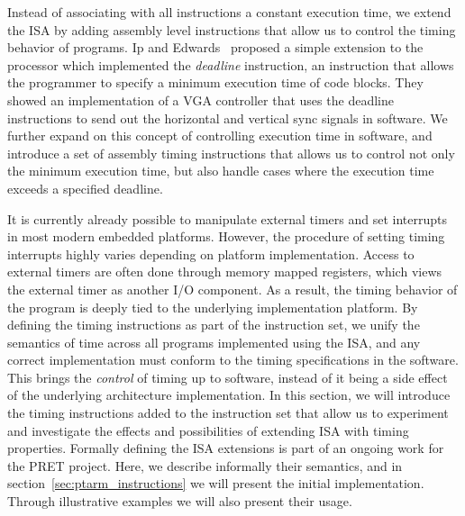 Instead of associating with all instructions a constant execution time, we extend the ISA by adding assembly level instructions that allow us to control the timing behavior of programs. 
Ip and Edwards~\cite{ip2006processor} proposed a simple extension to the processor which implemented the \emph{deadline} instruction, an instruction that allows the programmer to specify a minimum execution time of code blocks.
They showed an implementation of a VGA controller that uses the deadline instructions to send out the horizontal and vertical sync signals in software.
We further expand on this concept of controlling execution time in software, and introduce a set of assembly timing instructions that allows us to 
control not only the minimum execution time, but also handle cases where the execution time exceeds a specified deadline.

It is currently already possible to manipulate external timers and set interrupts in most modern embedded platforms.
However, the procedure of setting timing interrupts highly varies depending on platform implementation.
Access to external timers are often done through memory mapped registers, which views the external timer as another I/O component.
As a result, the timing behavior of the program is deeply tied to the underlying implementation platform.
By defining the timing instructions as part of the instruction set, we unify the semantics of time across all programs implemented using the ISA, and any correct implementation must conform to the timing specifications in the software.
This brings the \emph{control} of timing up to software, instead of it being a side effect of the underlying architecture implementation.  
In this section, we will introduce the timing instructions added to the instruction set that allow us to experiment and investigate the effects and possibilities of extending ISA with timing properties.
Formally defining the ISA extensions is part of an ongoing work for the PRET project.
Here, we describe informally their semantics, and in section~\ref{sec:ptarm_instructions} we will present the initial implementation.
Through illustrative examples we will also present their usage.


